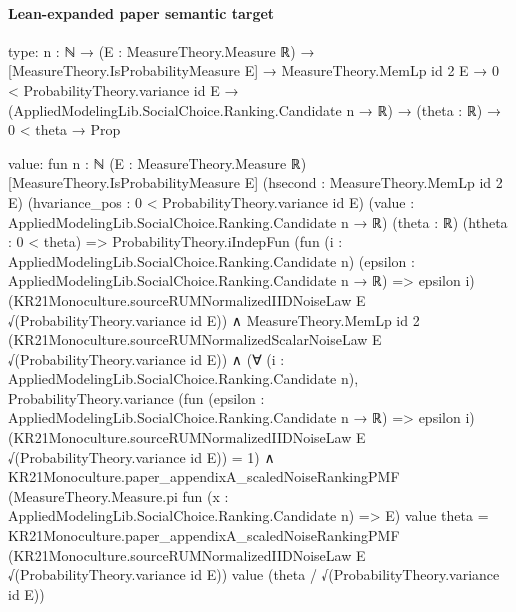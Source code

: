 \documentclass[10pt]{article}
\begin{document}
\paragraph{Lean-expanded paper semantic target}
\begin{ReviewVerbatim}
type:
{n : ℕ} →
  (E : MeasureTheory.Measure ℝ) →
    [MeasureTheory.IsProbabilityMeasure E] →
      MeasureTheory.MemLp id 2 E →
        0 < ProbabilityTheory.variance id E →
          (AppliedModelingLib.SocialChoice.Ranking.Candidate n → ℝ) → (theta : ℝ) → 0 < theta → Prop

value:
fun {n : ℕ} (E : MeasureTheory.Measure ℝ) [MeasureTheory.IsProbabilityMeasure E] (hsecond : MeasureTheory.MemLp id 2 E)
    (hvariance_pos : 0 < ProbabilityTheory.variance id E)
    (value : AppliedModelingLib.SocialChoice.Ranking.Candidate n → ℝ) (theta : ℝ) (htheta : 0 < theta) =>
  ProbabilityTheory.iIndepFun
      (fun (i : AppliedModelingLib.SocialChoice.Ranking.Candidate n)
          (epsilon : AppliedModelingLib.SocialChoice.Ranking.Candidate n → ℝ) =>
        epsilon i)
      (KR21Monoculture.sourceRUMNormalizedIIDNoiseLaw E √(ProbabilityTheory.variance id E)) ∧
    MeasureTheory.MemLp id 2 (KR21Monoculture.sourceRUMNormalizedScalarNoiseLaw E √(ProbabilityTheory.variance id E)) ∧
      (∀ (i : AppliedModelingLib.SocialChoice.Ranking.Candidate n),
          ProbabilityTheory.variance
              (fun (epsilon : AppliedModelingLib.SocialChoice.Ranking.Candidate n → ℝ) => epsilon i)
              (KR21Monoculture.sourceRUMNormalizedIIDNoiseLaw E √(ProbabilityTheory.variance id E)) =
            1) ∧
        KR21Monoculture.paper_appendixA_scaledNoiseRankingPMF
            (MeasureTheory.Measure.pi fun (x : AppliedModelingLib.SocialChoice.Ranking.Candidate n) => E) value theta =
          KR21Monoculture.paper_appendixA_scaledNoiseRankingPMF
            (KR21Monoculture.sourceRUMNormalizedIIDNoiseLaw E √(ProbabilityTheory.variance id E)) value
            (theta / √(ProbabilityTheory.variance id E))
\end{ReviewVerbatim}
\end{document}
